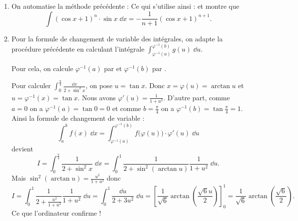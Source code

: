 \documentclass[class=report,crop=false]{standalone}
\begin{document}
\begin{enumerate}
  
  \item On automatise la méthode précédente :
  Ce qui s'utilise ainsi :
  et montre que 
  $$\int (\cos x + 1)^n \cdot \sin x \; \dd x =  -\frac{1}{n + 1}(\cos x + 1)^{n + 1}.$$
 
  \item Pour la formule de changement de variable des intégrales, on adapte la procédure précédente
  en calculant l'intégrale $\int_{\varphi^{-1}(a)}^{\varphi^{-1}(b)} g(u) \; \dd u$.
  
  Pour cela, on calcule 
  $\varphi^{-1}(a)$ par   et 
  $\varphi^{-1}(b)$ par  .
 
  Pour calculer $\int_0^{\frac\pi4} \frac{\dd x}{2+\sin^2 x}$,
  on pose  $u = \tan x$.
  Donc $x = \varphi(u) = \arctan u$ et $u = \varphi^{-1}(x) = \tan x$.
  Nous avons $\varphi'(u)= \frac{1}{1+u^2}$. D'autre part,
  comme $a=0$ on a $\varphi^{-1}(a) = \tan 0 = 0$
  et comme $b = \frac\pi4$ on a $\varphi^{-1}(b) = \tan \frac\pi4 = 1$.
  Ainsi la formule de changement de variable :
  $$\int_a^b f(x) \;\dd x =
  \int_{\varphi^{-1}(a)}^{\varphi^{-1}(b)} f\big(\varphi(u)\big)\cdot\varphi'(u) \; \dd u$$
  devient 
  $$I = \int_0^{\frac\pi4} \frac{1}{2+\sin^2 x} \; \dd x = 
  \int_0^1 \frac{1}{2+\sin^2 (\arctan u)} \frac{1}{1+u^2}  \; \dd u.$$
  Mais $\sin^2(\arctan u ) = \frac{u^2}{1+u^2}$ donc
  $$I = \int_0^1 \frac{1}{2+\frac{u^2}{1+u^2}} \frac{1}{1+u^2}  \; \dd u
  = \int_0^1 \frac{\dd u}{2+3u^2}  \; \dd u = \left[\frac{1}{\sqrt6}\arctan\left(\frac{\sqrt6 u}{2}\right)\right]_0^1
  = \frac{1}{\sqrt6}\arctan\left(\frac{\sqrt6}{2}\right).$$
  Ce que l'ordinateur confirme !
\end{enumerate}

\finchapitre
\end{document}
